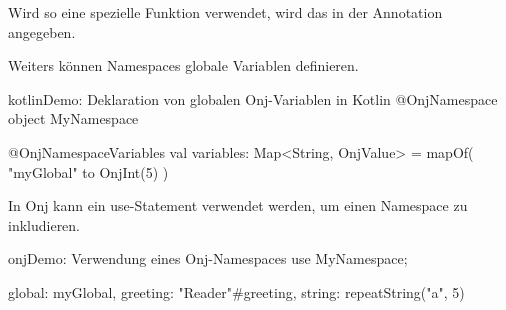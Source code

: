 Wird so eine spezielle Funktion verwendet, wird das in der  Annotation angegeben.


Weiters können Namespaces globale Variablen definieren.

\begin{codeBlock}{kotlin}{Demo: Deklaration von globalen Onj-Variablen in Kotlin}
@OnjNamespace
object MyNamespace {

    @OnjNamespaceVariables
    val variables: Map<String, OnjValue> = mapOf(
        "myGlobal" to OnjInt(5)
    )
}
\end{codeBlock}

In Onj kann ein use-Statement verwendet werden, um einen Namespace zu inkludieren.

\begin{codeBlock}{onj}{Demo: Verwendung eines Onj-Namespaces}
use MyNamespace;

global: myGlobal,
greeting: "Reader"#greeting,
string: repeatString("a", 5)
\end{codeBlock}

\renewcommand{\kapitelautor}{}
